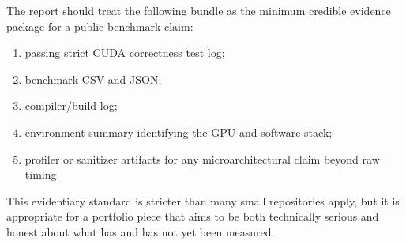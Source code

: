 The report should treat the following bundle as the minimum credible evidence package for a public benchmark claim:
\begin{enumerate}
  \item passing strict CUDA correctness test log;
  \item benchmark CSV and JSON;
  \item compiler/build log;
  \item environment summary identifying the GPU and software stack;
  \item profiler or sanitizer artifacts for any microarchitectural claim beyond raw timing.
\end{enumerate}

This evidentiary standard is stricter than many small repositories apply, but it is appropriate for a portfolio piece that aims to be both technically serious and honest about what has and has not yet been measured.
